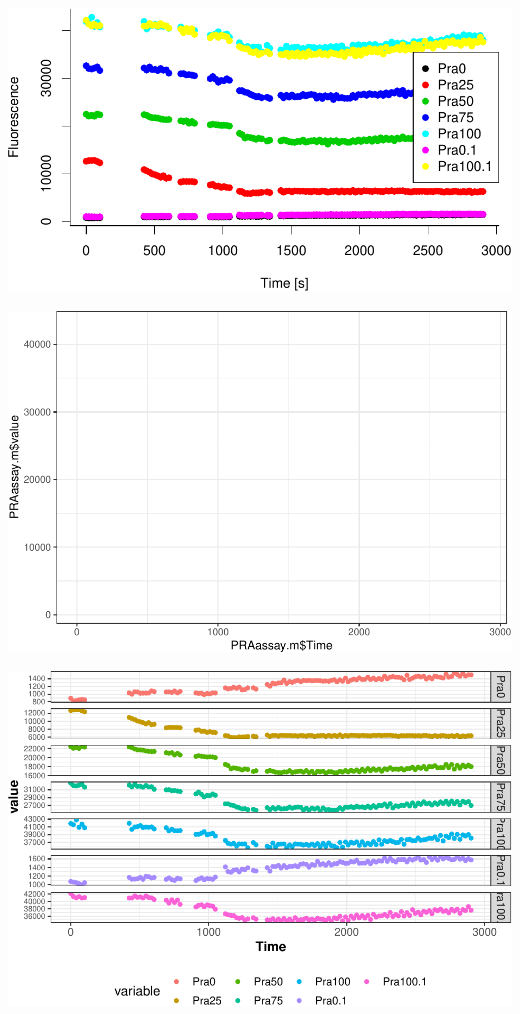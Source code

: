 \documentclass[12pt,twoside]{reedthesis}
\begin{document}
{  \begin{center}\includegraphics{tesis_files/figure-latex/Cinetics-4} \end{center}
  
  \begin{center}\includegraphics{tesis_files/figure-latex/Cinetics-5} \end{center}
  
  \begin{center}\includegraphics{tesis_files/figure-latex/Cinetics-6} \end{center}
  
}
\end{document}
